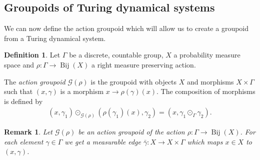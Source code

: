 \documentclass[12pt,a4paper]{scrartcl}
\theoremstyle{plain}
\newtheorem{Remark}[Theorem]{Remark}
\theoremstyle{definition}
\newtheorem{Definition}[Theorem]{Definition}
\newcommand{\2}{\mathbb{Z} / 2 \mathbb{Z}}
\newcommand{\G}{\mathcal{G}}
\newcommand{\1}{\bar{1}}
\newcommand{\0}{\bar{0}}
\newcommand{\Bij}{\operatorname{Bij}}
\begin{document}
\subsection{Groupoids of Turing dynamical systems}
We can now define the action groupoid which will allow us to create a groupoid from a Turing dynamical system.
\begin{Definition} \label{action_groupoid}
	Let $\Gamma$ be a discrete, countable group, $X$ a probability measure space and $\rho\colon\Gamma \to \Bij(X)$ a right measure preserving action.
	
	The \emph{action groupoid} $\G(\rho)$ is the groupoid with objects $X$ and morphisms $X \times \Gamma$ such that $(x,\gamma)$ is a morphism $x \to \rho(\gamma)(x)$. The composition of morphisms is defined by
	\begin{align*}
		(x, \gamma_1) \odot_{\G(\rho)} (\rho(\gamma_1) (x), \gamma_2) = (x, \gamma_1 \odot_\Gamma \gamma_2).
	\end{align*}
\end{Definition}

\begin{Remark} \label{mE_action_groupoid}
	Let $\G(\rho)$ be an action groupoid of the action $\rho \colon \Gamma \to \Bij(X)$. For each element $\gamma \in \Gamma$ we get a measurable edge $\bar{\gamma}\colon X \to X \times \Gamma$ which maps $x \in X$ to $(x, \gamma)$.
\end{Remark}
\end{document}
